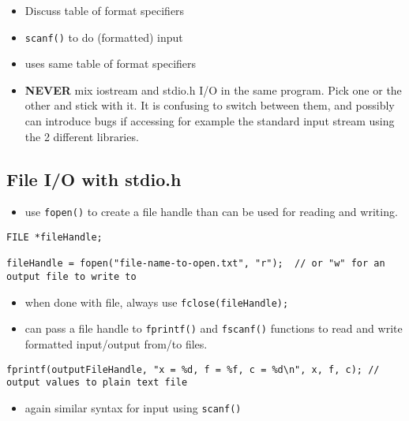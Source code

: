 \documentclass[11pt]{article}
\begin{document}
\begin{itemize}
\item Discuss table of format specifiers
\item \verb~scanf()~ to do (formatted) input
\item uses same table of format specifiers
\item \textbf{NEVER} mix iostream and stdio.h I/O in the same program.  Pick one
or the other and stick with it.  It is confusing to switch between
them, and possibly can introduce bugs if accessing for example the
standard input stream using the 2 different libraries.
\end{itemize}
\subsection{File I/O with stdio.h}
\label{sec-3-2}

\begin{itemize}
\item use \verb~fopen()~  to create a file handle than can be used for reading and
writing.
\end{itemize}

\begin{verbatim}
FILE *fileHandle;

fileHandle = fopen("file-name-to-open.txt", "r");  // or "w" for an output file to write to
\end{verbatim}

\begin{itemize}
\item when done with file, always use \verb~fclose(fileHandle);~
\item can pass a file handle to \verb~fprintf()~ and \verb~fscanf()~ functions to read
and write formatted input/output from/to files.
\end{itemize}

\begin{verbatim}
fprintf(outputFileHandle, "x = %d, f = %f, c = %d\n", x, f, c); // output values to plain text file
\end{verbatim}

\begin{itemize}
\item again similar syntax for input using \verb~scanf()~
\end{itemize}
\end{document}
